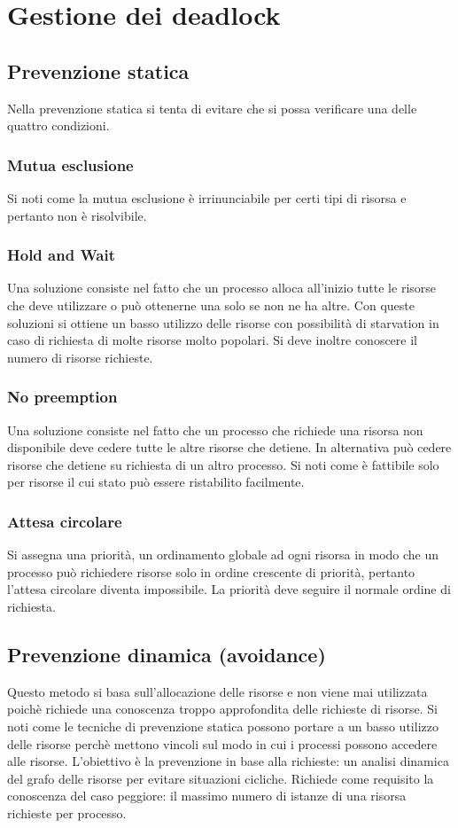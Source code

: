 \section{Gestione dei deadlock}
\subsection{Prevenzione statica}
Nella prevenzione statica si tenta di evitare che si possa verificare una delle quattro condizioni. 
\subsubsection{Mutua esclusione}
Si noti come la mutua esclusione \`e irrinunciabile per certi tipi di risorsa e pertanto non \`e risolvibile.
\subsubsection{Hold and Wait}
Una soluzione consiste nel fatto che un processo alloca all'inizio tutte le risorse che deve utilizzare o pu\`o ottenerne una solo se non ne ha altre. Con queste soluzioni si ottiene
un basso utilizzo delle risorse con possibilit\`a di starvation in caso di richiesta di molte risorse molto popolari. Si deve inoltre conoscere il numero di risorse richieste. 
\subsubsection{No preemption}
Una soluzione consiste nel fatto che un processo che richiede una risorsa non disponibile deve cedere tutte le altre risorse che detiene. In alternativa pu\`o cedere risorse che 
detiene su richiesta di un altro processo. Si noti come \`e fattibile solo per risorse il cui stato pu\`o essere ristabilito facilmente. 
\subsubsection{Attesa circolare}
Si assegna una priorit\`a, un ordinamento globale ad ogni risorsa in modo che un processo pu\`o richiedere risorse solo in ordine crescente di priorit\`a, pertanto l'attesa circolare
diventa impossibile. La priorit\`a deve seguire il normale ordine di richiesta. 
\subsection{Prevenzione dinamica (avoidance)}
Questo metodo si basa sull'allocazione delle risorse e non viene mai utilizzata poich\`e richiede una conoscenza troppo approfondita delle richieste di risorse. Si noti come le 
tecniche di prevenzione statica possono portare a un basso utilizzo delle risorse perch\`e mettono vincoli sul modo in cui i processi possono accedere alle risorse. L'obiettivo \`e la
prevenzione in base alla richieste: un analisi dinamica del grafo delle risorse per evitare situazioni cicliche. Richiede come requisito la conoscenza del caso peggiore: il massimo 
numero di istanze di una risorsa richieste per processo. 
